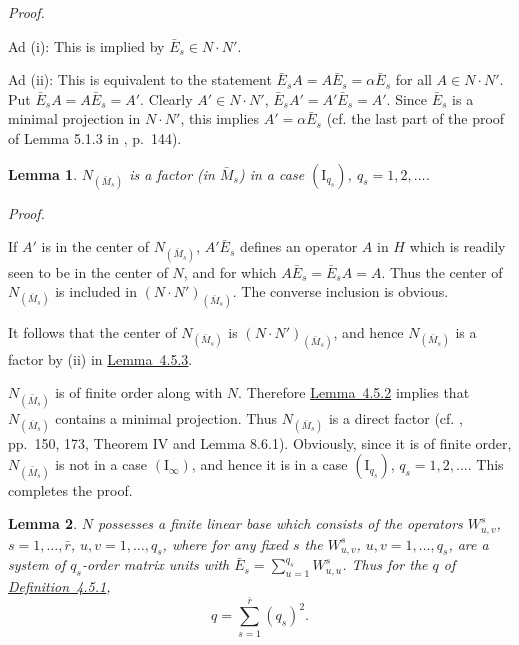\documentclass[b5paper,twoside]{article}
\newcommand{\lemref}[2]{\hyperref[#1]{\mbox{Lemma~#2}}}
\newcommand{\defref}[2]{\hyperref[#1]{\mbox{Definition~#2}}}
\theoremstyle{mvnplain}
\newtheorem{lemma}{Lemma}[section]
\renewenvironment{proof}[1][Proof]{%
  \par\addvspace{0.35\baselineskip}%
  \noindent\textit{#1.}\ \normalfont\ignorespaces
}{%
  \par\addvspace{0.35\baselineskip}%
}
\newcommand{\N}{\mathbf N}
\newcommand{\Hilbert}{\mathfrak H}
\def\N{N}%
\def\Hilbert{H}%
\def\mathfrak#1{#1}%
\begin{document}
\begin{proof}
Ad (i): This is implied by \(\bar E_s\in\N\mathbin{\cdot}\N'\).

Ad (ii): This is equivalent to the statement
\(\bar E_sA=A\bar E_s=\alpha\bar E_s\) for all
\(A\in\N\mathbin{\cdot}\N'\). Put
\(\bar E_sA=A\bar E_s=A'\). Clearly
\(A'\in\N\mathbin{\cdot}\N'\),
\(\bar E_sA'=A'\bar E_s=A'\). Since \(\bar E_s\) is a minimal projection
in \(\N\mathbin{\cdot}\N'\), this implies \(A'=\alpha\bar E_s\) (cf. the
last part of the proof of Lemma 5.1.3 in \cite{ref5}, p.~144).
\end{proof}

\begin{lemma}\label{lem:4.5.4}
\(\N_{(\bar{\mathfrak M}_s)}\) is a factor (in \(\bar{\mathfrak M}_s\)) in a
case \((\mathrm I_{q_s})\), \(q_s=1,2,\ldots\).
\end{lemma}

\begin{proof}
If \(A'\) is in the center of \(\N_{(\bar{\mathfrak M}_s)}\),
\(A'\bar E_s\) defines an operator \(A\) in \(\Hilbert\) which is readily seen
to be in the center of \(\N\), and for which
\(A\bar E_s=\bar E_sA=A\). Thus the center of
\(\N_{(\bar{\mathfrak M}_s)}\) is included in
\((\N\mathbin{\cdot}\N')_{(\bar{\mathfrak M}_s)}\). The converse inclusion
is obvious.

It follows that the center of \(\N_{(\bar{\mathfrak M}_s)}\) is
\((\N\mathbin{\cdot}\N')_{(\bar{\mathfrak M}_s)}\), and hence
\(\N_{(\bar{\mathfrak M}_s)}\) is a factor by (ii) in
\lemref{lem:4.5.3}{4.5.3}.

\(\N_{(\bar{\mathfrak M}_s)}\) is of finite order along with \(\N\).
Therefore \lemref{lem:4.5.2}{4.5.2} implies that
\(\N_{(\bar{\mathfrak M}_s)}\) contains a minimal projection. Thus
\(\N_{(\bar{\mathfrak M}_s)}\) is a direct factor (cf.
\cite{ref5}, pp.~150, 173, Theorem IV and Lemma 8.6.1).
Obviously, since it is of finite order, \(\N_{(\bar{\mathfrak M}_s)}\) is not
in a case \((\mathrm I_\infty)\), and hence it is in a case
\((\mathrm I_{q_s})\), \(q_s=1,2,\ldots\). This completes the proof.
\end{proof}

\begin{lemma}\label{lem:4.5.5}
\(\N\) possesses a finite linear base which consists of the operators
\(W^s_{u,v}\), \(s=1,\ldots,\bar r\), \(u,v=1,\ldots,q_s\), where for any
fixed \(s\) the \(W^s_{u,v}\), \(u,v=1,\ldots,q_s\), are a system of
\(q_s\)-order matrix units with
\(\bar E_s=\sum_{u=1}^{q_s}W^s_{u,u}\). Thus for the \(q\) of
\defref{def:4.5.1}{4.5.1},
\[
 q=\sum_{s=1}^{\bar r}(q_s)^2.
\]
\end{lemma}
\end{document}
